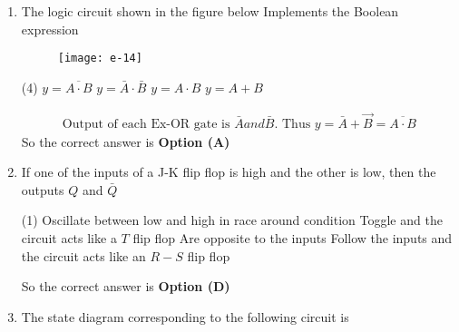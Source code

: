 \begin{enumerate}
	\begin{figure}[H]
		\centering
		\texttt{[image: diagram-20211018(3)-crop]}
	\end{figure}
	If the counter is initialized as $A_{0} A_{1} A_{2} A_{3}=0110$, the state after the next clock pulse is
\begin{tasks}(4)
\end{tasks}
\begin{answer}$\left. \right. $
\begin{figure}[H]
	\centering
	\texttt{[image: e5s]}
\end{figure}
So the correct answer is \textbf{Option (B)}
\end{answer}
	\item The logic circuit shown in the figure below Implements the Boolean expression
\begin{figure}[H]
\centering
\texttt{[image: e-14]}
\end{figure}
\begin{tasks}(4)
\task[\textbf{A.}] $y=\overline{A \cdot B}$
\task[\textbf{B.}] $y=\bar{A} \cdot \bar{B}$
\task[\textbf{C.}] $y=A \cdot B$
\task[\textbf{D.}] $y=A+B$
\end{tasks}
\begin{answer}
\begin{align*}
\text{Output of each Ex-OR gate is }\bar{A} and \bar{B}.\text{ Thus }y=\bar{A}+\vec{B}=\overline{A \cdot B}
\end{align*}
So the correct answer is \textbf{Option (A)}
\end{answer}
\item 	If one of the inputs of a J-K flip flop is high and the other is low, then the outputs $Q$ and $\bar{Q}$
\begin{tasks}(1)
\task[\textbf{A.}] Oscillate between low and high in race around condition
\task[\textbf{B.}] Toggle and the circuit acts like a $T$ flip flop
\task[\textbf{C.}] Are opposite to the inputs
\task[\textbf{D.}] Follow the inputs and the circuit acts like an $R-S$ flip flop
\end{tasks}
\begin{answer}
So the correct answer is \textbf{Option (D)}
\end{answer}
	\item The state diagram corresponding to the following circuit is
\begin{figure}[H]

\end{figure}
\end{enumerate}
